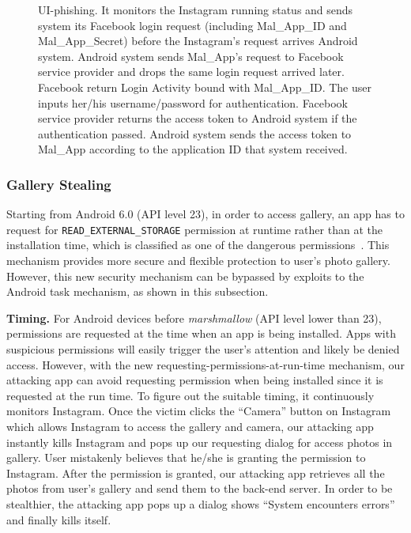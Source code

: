 \documentclass[letterpaper,12pt]{article}
\begin{document}
\begin{figure}[t]
{        UI-phishing. It monitors the Instagram running status and
        sends system its Facebook login request (including Mal\_App\_ID and
        Mal\_App\_Secret) before the Instagram's request arrives
        Android system. Android system sends Mal\_App's request to
        Facebook service provider and
        drops the same login request arrived later. Facebook return
        Login Activity bound with Mal\_App\_ID. The user inputs her/his
          username/password for authentication. Facebook service
          provider returns the access token to Android system if the
          authentication passed. Android system sends the access token
        to  Mal\_App according to the application ID that system
        received.}
        \vspace{-0.2cm}
           \label{fig:mitm}
\end{figure}

\subsubsection{Gallery Stealing}
Starting from Android 6.0 (API level 23), in order to access gallery,
an app has to request for \texttt{READ\_EXTERNAL\_STORAGE} permission
at runtime rather than at the installation time, which is classified
as one of the dangerous permissions~\cite{permissionruntime}. This
mechanism provides more secure and flexible protection to user's photo
gallery.  However, this new security mechanism can be bypassed by
exploits to the Android task mechanism, as shown in this subsection.

\noindent\textbf{Timing.} 
For Android devices before \textit{marshmallow} (API level lower than
23), permissions are requested at the time when an app is being
installed. Apps with suspicious permissions will easily trigger the
user's attention and likely be denied access. However, with the new
requesting-permissions-at-run-time mechanism, our attacking app can
avoid requesting permission when being installed since it is requested
at the run time. To figure out the suitable timing, it continuously
monitors Instagram.  Once the victim clicks the ``Camera'' button on
Instagram which allows Instagram to access the gallery and camera, our
attacking app instantly kills Instagram and pops up our requesting
dialog for access photos in gallery. User mistakenly believes that
he/she is granting the permission to Instagram. After the permission
is granted, our attacking app retrieves all the photos from user's
gallery and send them to the back-end server. In order to be
stealthier, the attacking app pops up a dialog shows ``System
encounters errors'' and finally kills itself.
\end{document}
